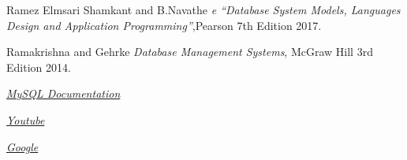 \documentclass[12pt, letter paper]{report}
\begin{document}
\begin{thebibliography}{7}
Ramez Elmsari Shamkant and B.Navathe  \emph{e “Database System Models, Languages Design and Application Programming”},Pearson 7th Edition 2017.

 Ramakrishna and Gehrke \emph{Database Management Systems}, McGraw Hill 3rd Edition 2014.

  \href{https://docs.oracle.com/en-us/iaas/mysql-database/doc/getting-started.html}{\emph{MySQL Documentation}}
 
 \href{www.youtube.com}{\emph{Youtube}}
 
\href{www.google.com}{\emph{Google}}

\end{thebibliography}
\end{document}
